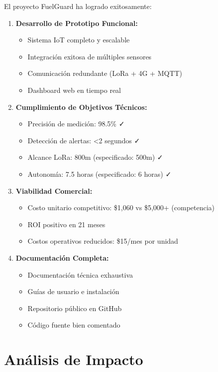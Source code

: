 \documentclass[12pt,a4paper,oneside]{report}
\begin{document}
El proyecto FuelGuard ha logrado exitosamente:

\begin{enumerate}
    \item \textbf{Desarrollo de Prototipo Funcional:}
    \begin{itemize}
        \item Sistema IoT completo y escalable
        \item Integración exitosa de múltiples sensores
        \item Comunicación redundante (LoRa + 4G + MQTT)
        \item Dashboard web en tiempo real
    \end{itemize}
    
    \item \textbf{Cumplimiento de Objetivos Técnicos:}
    \begin{itemize}
        \item Precisión de medición: 98.5\% ✓
        \item Detección de alertas: <2 segundos ✓
        \item Alcance LoRa: 800m (especificado: 500m) ✓
        \item Autonomía: 7.5 horas (especificado: 6 horas) ✓
    \end{itemize}
    
    \item \textbf{Viabilidad Comercial:}
    \begin{itemize}
        \item Costo unitario competitivo: \$1,060 vs \$5,000+ (competencia)
        \item ROI positivo en 21 meses
        \item Costos operativos reducidos: \$15/mes por unidad
    \end{itemize}
    
    \item \textbf{Documentación Completa:}
    \begin{itemize}
        \item Documentación técnica exhaustiva
        \item Guías de usuario e instalación
        \item Repositorio público en GitHub
        \item Código fuente bien comentado
    \end{itemize}
\end{enumerate}

\section{Análisis de Impacto}
\end{document}
